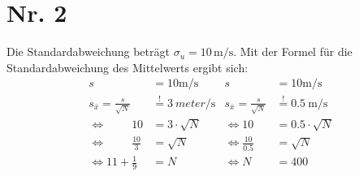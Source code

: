 \section*{Nr. 2}
Die Standardabweichung beträgt $\sigma_u = 10\,\mathrm{m/s}$.
Mit der Formel für die Standardabweichung des Mittelwerts ergibt sich:
\begin{align*}
                       s                            &= 10 \unit{\meter\per\second}                & s                                 &= 10 \unit{\meter\per\second}                  \\
     s_{\bar{x}} = \frac{s}{\sqrt{N}}                &\stackrel{!}{=}  \qty{3}{meter\per\second}  & s_{\bar{x}} = \frac{s}{\sqrt{N}}  &\stackrel{!}{=} \qty{0.5}{\meter\per\second}   \\ 
     \Leftrightarrow  \phantom{11 +} 10              &= 3 \cdot \sqrt{N}                          & \Leftrightarrow  10               &= 0.5 \cdot \sqrt{N}                           \\ 
     \Leftrightarrow  \phantom{11 +} \frac{10}{3}    &= \sqrt{N}                                  & \Leftrightarrow  \frac{10}{0.5}   &= \sqrt{N}                                     \\ 
     \Leftrightarrow   11 + \frac{1}{9}              &= N                                         & \Leftrightarrow             N     &=  400                                         \\
\end{align*}



